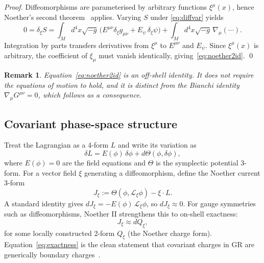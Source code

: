 \documentclass[12pt,a4paper]{article}
\newtheorem{remark}{Remark}[section]
\newcommand{\Jxi}{J_\xi}
\newcommand{\Qxi}{Q_\xi}
\newcommand{\onshell}{\approx}
\begin{document}
\begin{proof}
Diffeomorphisms are parameterised by arbitrary functions
$\xi^\mu(x)$, hence Noether's second
theorem~\cite{Noether1918} applies. Varying $S$ under
\eqref{eq:diffvar} yields
\begin{equation}
  0 = \delta_\xi S = \int_M d^4x\sqrt{-g}\,
  \bigl(E^{\mu\nu}\delta_\xi g_{\mu\nu}
  + E_\psi\,\delta_\xi\psi\bigr)
  + \int_M d^4x\sqrt{-g}\,\nabla_\mu(\cdots).
\end{equation}
Integration by parts transfers derivatives from $\xi^\mu$
to $E^{\mu\nu}$ and $E_\psi$. Since $\xi^\mu(x)$ is
arbitrary, the coefficient of $\xi_\mu$ must vanish
identically, giving~\eqref{eq:noether2id}. \qed
\end{proof}

\begin{remark}
Equation~\eqref{eq:noether2id} is an off-shell identity. It
does not require the equations of motion to hold, and it
is distinct from the Bianchi identity $\nabla_\mu G^{\mu\nu}
= 0$, which follows as a consequence.
\end{remark}

\subsection{Covariant phase-space structure}

Treat the Lagrangian as a 4-form $L$ and write its
variation as
\begin{equation}
  \delta L = E(\phi)\,\delta\phi + d\Theta(\phi,\delta\phi),
  \label{eq:deltaL}
\end{equation}
where $E(\phi) = 0$ are the field equations and $\Theta$
is the symplectic potential 3-form. For a vector field
$\xi$ generating a diffeomorphism, define the Noether
current 3-form
\begin{equation}
  \Jxi := \Theta(\phi, \mathcal{L}_\xi\phi) - \xi\cdot L.
  \label{eq:Jxi}
\end{equation}
A standard identity gives $d\Jxi = -E(\phi)\,
\mathcal{L}_\xi\phi$, so $d\Jxi \onshell 0$. For gauge
symmetries such as diffeomorphisms, Noether II strengthens
this to on-shell exactness:
\begin{equation}
  \Jxi \onshell d\Qxi,
  \label{eq:exactness}
\end{equation}
for some locally constructed 2-form $\Qxi$ (the Noether
charge form). Equation~\eqref{eq:exactness} is the clean
statement that covariant charges in GR are generically
boundary charges~\cite{LeeWald1990,IyerWald1994}.
\end{document}
